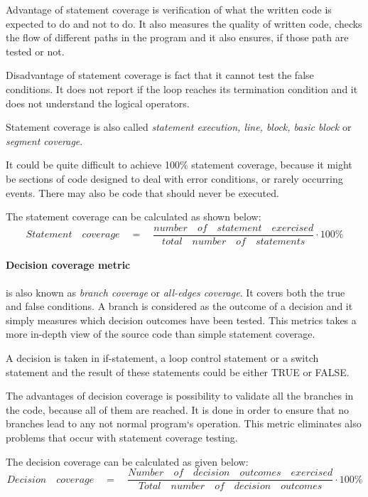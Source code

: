 Advantage of statement coverage is verification of what the written code is expected to do and not to do. It also measures the quality of written code, checks the flow of different paths in the program and it also ensures, if those path are tested or not.

Disadvantage of statement coverage is fact that it cannot test the false conditions. It does not report if the loop reaches its termination condition and it does not understand the logical operators.

Statement coverage is also called \textit{statement execution, line, block, basic block} or \textit{segment coverage}.

It could be quite difficult to achieve 100\% statement coverage, because it might be sections of code designed to deal with error conditions, or rarely occurring events. There may also be code that should never be executed.

The statement coverage can be calculated as shown below:
\begin{equation}
Statement\quad coverage\quad =\quad \frac { number\quad of\quad statement\quad exercised }{ total\quad number\quad of\quad statements } \cdot 100\%
\end{equation}


\paragraph{Decision coverage metric} is also known as \textit{branch coverage} or \textit{all-edges coverage}. It covers both the true and false conditions.  A branch is considered as the outcome of a decision and it  simply measures which decision outcomes have been tested. This metrics takes a more in-depth view of the source code than simple statement coverage.

A decision is taken in if-statement, a loop control statement  or a switch statement and the result of these statements could be either TRUE or FALSE.

The advantages of decision coverage is possibility to validate all the branches in the code, because all of them are reached. It is done in order to ensure that no branches lead to any not normal program`s operation. This metric eliminates also problems that occur with statement coverage testing. 

The decision coverage can be calculated as given below:
\begin{equation}
Decision\quad coverage\quad =\quad \frac { Number\quad of\quad decision\quad outcomes\quad exercised }{ Total\quad number\quad of\quad decision\quad outcomes } \cdot 100\%
\end{equation}

